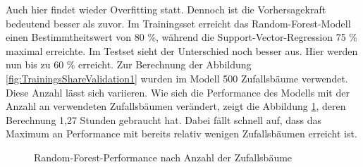 \documentclass[a4paper,12pt]{thesis}
\begin{document}
Auch hier findet wieder Overfitting statt. Dennoch ist die Vorhersagekraft bedeutend besser als zuvor. Im Trainingsset erreicht das Random-Forest-Modell einen Bestimmtheitswert von 80 \%, während die Support-Vector-Regression 75 \% maximal erreichte. Im Testset sieht der Unterschied noch besser aus. Hier werden nun bis zu 60 \% erreicht. Zur Berechnung der Abbildung \ref{fig:TrainingsShareValidation1} wurden im Modell 500 Zufallsbäume verwendet. Diese Anzahl lässt sich variieren. Wie sich die Performance des Modells mit der Anzahl an verwendeten Zufallsbäumen verändert, zeigt die Abbildung \ref{fig:NTreeValidation1}, deren Berechnung 1,27 Stunden gebraucht hat. Dabei fällt schnell auf, dass das Maximum an Performance mit bereits relativ wenigen Zufallsbäumen erreicht ist.

\begin{figure}%
	\centering
	\qquad
	\caption{Random-Forest-Performance nach Anzahl der Zufallsbäume}%
	\label{fig:NTreeValidation1}%
\end{figure}
\end{document}
